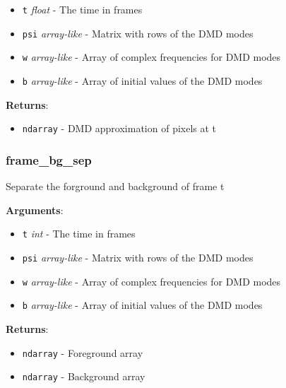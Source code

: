 \begin{itemize}
\tightlist
\item
  \texttt{t} \emph{float} - The time in frames
\item
  \texttt{psi} \emph{array-like} - Matrix with rows of the DMD modes
\item
  \texttt{w} \emph{array-like} - Array of complex frequencies for DMD
  modes
\item
  \texttt{b} \emph{array-like} - Array of initial values of the DMD
  modes
\end{itemize}

\textbf{Returns}:

\begin{itemize}
\tightlist
\item
  \texttt{ndarray} - DMD approximation of pixels at t
\end{itemize}

\subsubsection{frame\_bg\_sep}

\begin{Shaded}
\begin{Highlighting}[]
\end{Highlighting}
\end{Shaded}

Separate the forground and background of frame t

\textbf{Arguments}:

\begin{itemize}
\tightlist
\item
  \texttt{t} \emph{int} - The time in frames
\item
  \texttt{psi} \emph{array-like} - Matrix with rows of the DMD modes
\item
  \texttt{w} \emph{array-like} - Array of complex frequencies for DMD
  modes
\item
  \texttt{b} \emph{array-like} - Array of initial values of the DMD
  modes
\end{itemize}

\textbf{Returns}:

\begin{itemize}
\tightlist
\item
  \texttt{ndarray} - Foreground array
\item
  \texttt{ndarray} - Background array
\end{itemize}

